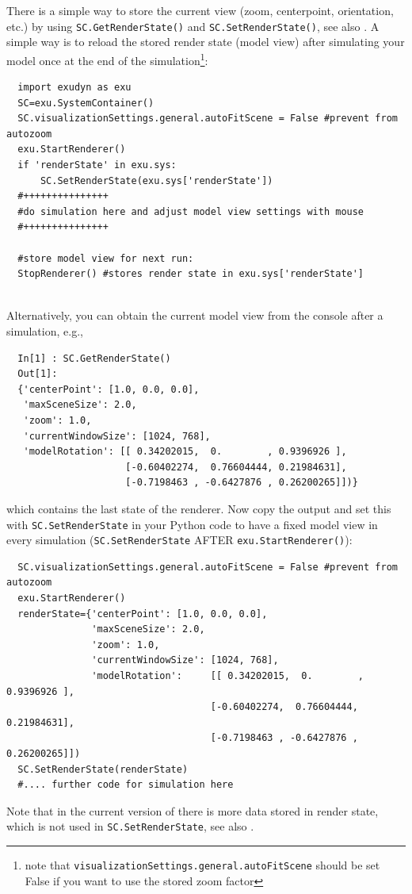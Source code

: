 There is a simple way to store the current view (zoom, centerpoint, orientation, etc.) by using \texttt{SC.GetRenderState()} and \texttt{SC.SetRenderState()},
see also .
%
A simple way is to reload the stored render state (model view) after simulating your model once at the end of the simulation\footnote{
note that \texttt{visualizationSettings.general.autoFitScene} should be set False if you want to use the stored zoom factor}:
\pythonstyle\begin{lstlisting}
  import exudyn as exu
  SC=exu.SystemContainer()
  SC.visualizationSettings.general.autoFitScene = False #prevent from autozoom
  exu.StartRenderer()
  if 'renderState' in exu.sys:
      SC.SetRenderState(exu.sys['renderState']) 
  #+++++++++++++++
  #do simulation here and adjust model view settings with mouse
  #+++++++++++++++

  #store model view for next run:
  StopRenderer() #stores render state in exu.sys['renderState']
\end{lstlisting}
\horizontalRuler \\
%
Alternatively, you can obtain the current model view from the console after a simulation, e.g.,
\pythonstyle\begin{lstlisting}
  In[1] : SC.GetRenderState()
  Out[1]: 
  {'centerPoint': [1.0, 0.0, 0.0],
   'maxSceneSize': 2.0,
   'zoom': 1.0,
   'currentWindowSize': [1024, 768],
   'modelRotation': [[ 0.34202015,  0.        , 0.9396926 ],
                     [-0.60402274,  0.76604444, 0.21984631],
                     [-0.7198463 , -0.6427876 , 0.26200265]])}
\end{lstlisting}
%
which contains the last state of the renderer.
Now copy the output and set this with \texttt{SC.SetRenderState} in your Python code to have a fixed model view in every simulation (\texttt{SC.SetRenderState} AFTER \texttt{exu.StartRenderer()}):
\pythonstyle\begin{lstlisting}
  SC.visualizationSettings.general.autoFitScene = False #prevent from autozoom
  exu.StartRenderer()
  renderState={'centerPoint': [1.0, 0.0, 0.0],
               'maxSceneSize': 2.0,
               'zoom': 1.0,
               'currentWindowSize': [1024, 768],
               'modelRotation':     [[ 0.34202015,  0.        ,  0.9396926 ],
                                    [-0.60402274,  0.76604444,  0.21984631],
                                    [-0.7198463 , -0.6427876 ,  0.26200265]])
  SC.SetRenderState(renderState)
  #.... further code for simulation here
\end{lstlisting}
Note that in the current version of \codeName there is more data stored in render state, which is not used in \texttt{SC.SetRenderState},
see also .
\horizontalRuler
%

